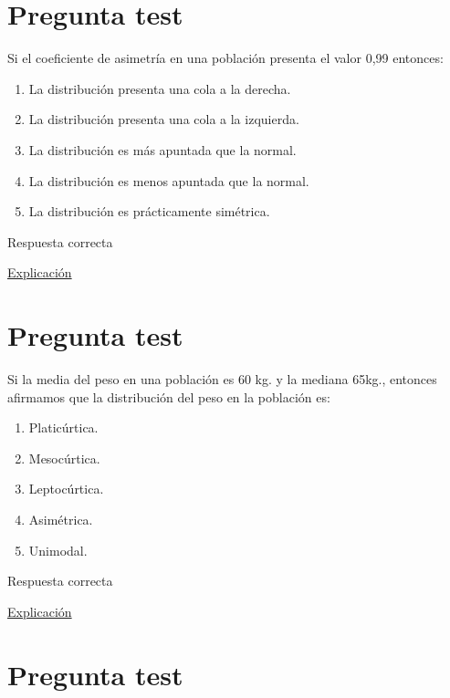 \documentclass[
]{book}
\providecommand{\tightlist}{%
  \setlength{\itemsep}{0pt}\setlength{\parskip}{0pt}}
\begin{document}
\hypertarget{pregunta-test-75}{%
\section{Pregunta test}\label{pregunta-test-75}}

Si el coeficiente de asimetría en una población presenta el valor 0,99 entonces:

\begin{enumerate}
\def\labelenumi{\alph{enumi})}
\tightlist
\item
  La distribución presenta una cola a la derecha.
\item
  La distribución presenta una cola a la izquierda.
\item
  La distribución es más apuntada que la normal.
\item
  La distribución es menos apuntada que la normal.
\item
  La distribución es prácticamente simétrica.
\end{enumerate}

Respuesta correcta

\href{https://1fjmanzano.github.io/bioestadistica/medidas-de-forma.html}{Explicación}

\hypertarget{pregunta-test-76}{%
\section{Pregunta test}\label{pregunta-test-76}}

Si la media del peso en una población es 60 kg. y la mediana 65kg., entonces afirmamos que la distribución del peso en la población es:

\begin{enumerate}
\def\labelenumi{\alph{enumi})}
\tightlist
\item
  Platicúrtica.
\item
  Mesocúrtica.
\item
  Leptocúrtica.
\item
  Asimétrica.
\item
  Unimodal.
\end{enumerate}

Respuesta correcta

\href{https://1fjmanzano.github.io/bioestadistica/medidas-de-forma.html}{Explicación}

\hypertarget{pregunta-test-77}{%
\section{Pregunta test}\label{pregunta-test-77}}
\end{document}
